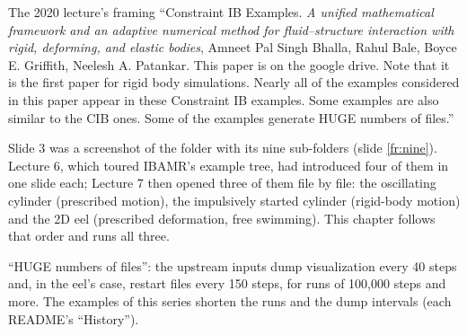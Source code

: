 \documentclass[aspectratio=169,11pt]{beamer}
\begin{document}
\begin{frame}{The 2020 lecture's framing}
\label{fr:lecture}
\footnotesize {} ``Constraint IB Examples. \emph{A unified mathematical framework and an adaptive numerical method for fluid--structure interaction with rigid, deforming, and elastic bodies}, Amneet Pal Singh Bhalla, Rahul Bale, Boyce E. Griffith, Neelesh A. Patankar. This paper is on the google drive. Note that it is the first paper for rigid body simulations. Nearly all of the examples considered in this paper appear in these Constraint IB examples. Some examples are also similar to the CIB ones. Some of the examples generate HUGE numbers of files.''
\vspace{1mm}

\footnotesize Slide 3 was a screenshot of the folder  with its nine sub-folders (slide \ref{fr:nine}). Lecture 6, which toured IBAMR's example tree, had introduced four of them in one slide each; Lecture 7 then opened three of them file by file: the oscillating cylinder (prescribed motion), the impulsively started cylinder (rigid-body motion) and the 2D eel (prescribed deformation, free swimming). This chapter follows that order and runs all three.
\begin{punchbox}
\footnotesize ``HUGE numbers of files'': the upstream inputs dump visualization every 40 steps and, in the eel's case, restart files every 150 steps, for runs of 100,000 steps and more. The examples of this series shorten the runs and the dump intervals (each README's ``History'').
\end{punchbox}
\end{frame}
\end{document}
